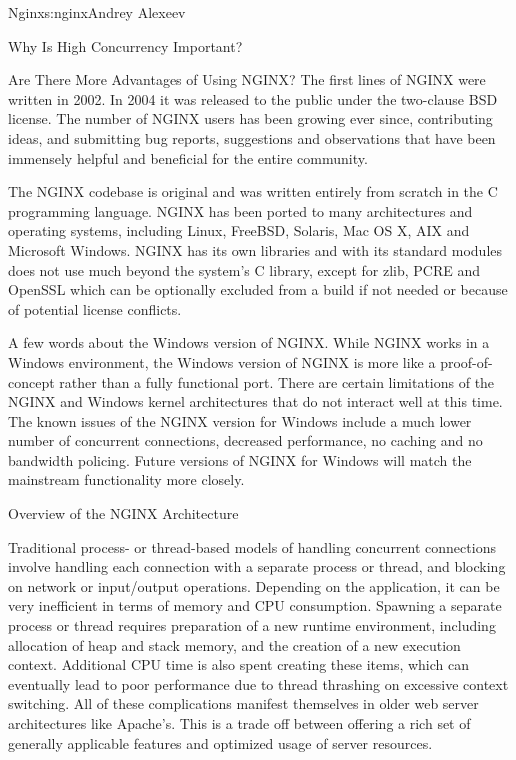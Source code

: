 \begin{aosachapter}{Nginx}{s:nginx}{Andrey Alexeev}
\begin{aosasect1}{Why Is High Concurrency Important?}
\begin{aosasect2}{Are There More Advantages of Using NGINX?}
The first lines of NGINX were written in 2002. In 2004 it was released
to the public under the two-clause BSD license. The number of NGINX
users has been growing ever since, contributing ideas, and submitting
bug reports, suggestions and observations that have been immensely
helpful and beneficial for the entire community.

The NGINX codebase is original and was written entirely from scratch
in the C programming language. NGINX has been ported to many
architectures and operating systems, including Linux, FreeBSD,
Solaris, Mac OS X, AIX and Microsoft Windows. NGINX has its own
libraries and with its standard modules does not use much beyond the
system's C library, except for zlib, PCRE and OpenSSL which can be
optionally excluded from a build if not needed or because of potential
license conflicts.

A few words about the Windows version of NGINX. While NGINX works in a
Windows environment, the Windows version of NGINX is more like a
proof-of-concept rather than a fully functional port. There are
certain limitations of the NGINX and Windows kernel architectures that
do not interact well at this time. The known issues of the NGINX
version for Windows include a much lower number of concurrent
connections, decreased performance, no caching and no bandwidth
policing. Future versions of NGINX for Windows will match the
mainstream functionality more closely.

\end{aosasect2}

\end{aosasect1}

\begin{aosasect1}{Overview of the NGINX Architecture}

Traditional process- or thread-based models of handling concurrent
connections involve handling each connection with a separate process
or thread, and blocking on network or input/output
operations. Depending on the application, it can be very inefficient
in terms of memory and CPU consumption. Spawning a separate process or
thread requires preparation of a new runtime environment, including
allocation of heap and stack memory, and the creation of a new
execution context. Additional CPU time is also spent creating these
items, which can eventually lead to poor performance due to thread
thrashing on excessive context switching. All of these complications
manifest themselves in older web server architectures like
Apache's. This is a trade off between offering a rich set of generally
applicable features and optimized usage of server resources.


\end{aosasect1}
\end{aosachapter}
